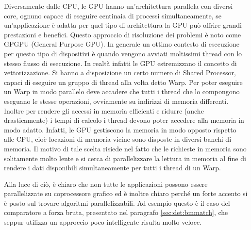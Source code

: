 Diversamente dalle CPU, le GPU hanno un'architettura parallela con diversi core, ognuno capace di eseguire centinaia di processi simultaneamente, se un'applicazione è adatta per quel tipo di architettura la GPU può offrire grandi prestazioni e benefici. Questo approccio di risoluzione dei problemi è noto come GPGPU (General Purpose GPU). In generale un ottimo contesto di esecuzione per questo tipo di dispositivi è quando vengono avviati moltissimi thread con lo stesso flusso di esecuzione. In realtà infatti le GPU estremizzano il concetto di vettorizzazione. Si hanno a disposizione un certo numero di Shared Processor, capaci di eseguire un gruppo di thread alla volta detto Warp. Per poter eseguire un Warp in modo parallelo deve accadere che tutti i thread che lo compongono eseguano le stesse operazioni, ovviamente su indirizzi di memoria differenti. Inoltre per rendere gli accessi in memoria efficienti e ridurre (anche drasticamente) i tempi di calcolo i thread devono poter accedere alla memoria in modo adatto. Infatti, le GPU gestiscono la memoria in modo opposto rispetto alle CPU, cioè locazioni di memoria vicine sono disposte in diversi banchi di memoria. Il motivo di tale scelta risiede nel fatto che le richieste in memoria sono solitamente molto lente e si cerca di parallelizzare la lettura in memoria al fine di rendere i dati disponibili simultaneamente per tutti i thread di un Warp. 

Alla luce di ciò, è chiaro che non tutte le applicazioni possono essere parallelizzate su coprocessore grafico ed è inoltre chiaro perché un forte accento si è posto sul trovare algoritmi parallelizzabili. Ad esempio questo è il caso del comparatore a forza bruta, presentato nel paragrafo \ref{sec:det:bmmatch}, che seppur utilizza un approccio poco intelligente risulta molto veloce.

